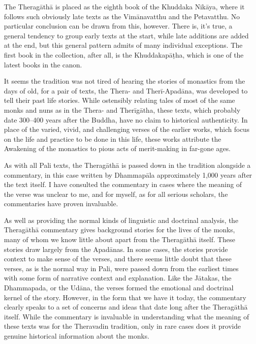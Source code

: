 \documentclass[12pt,openany]{book}%
\begin{document}
The \textsanskrit{Theragāthā} is placed as the eighth book of the Khuddaka \textsanskrit{Nikāya}, where it follows such obviously late texts as the \textsanskrit{Vimānavatthu} and the Petavatthu. No particular conclusion can be drawn from this, however. There is, it’s true, a general tendency to group early texts at the start, while late additions are added at the end, but this general pattern admits of many individual exceptions. The first book in the collection, after all, is the \textsanskrit{Khuddakapāṭha}, which is one of the latest books in the canon.

It seems the tradition was not tired of hearing the stories of monastics from the days of old, for a pair of texts, the Thera- and \textsanskrit{Therī}-\textsanskrit{Apadāna}, was developed to tell their past life stories. While ostensibly relating tales of most of the same monks and nuns as in the Thera- and \textsanskrit{Therīgātha}, these texts, which probably date 300–400 years after the Buddha, have no claim to historical authenticity. In place of the varied, vivid, and challenging verses of the earlier works, which focus on the life and practice to be done in this life, these works attribute the Awakening of the monastics to pious acts of merit-making in far-gone ages.

As with all Pali texts, the \textsanskrit{Theragāthā} is passed down in the tradition alongside a commentary, in this case written by \textsanskrit{Dhammapāla} approximately 1,000 years after the text itself. I have consulted the commentary in cases where the meaning of the verse was unclear to me, and for myself, as for all serious scholars, the commentaries have proven invaluable.

As well as providing the normal kinds of linguistic and doctrinal analysis, the \textsanskrit{Theragāthā} commentary gives background stories for the lives of the monks, many of whom we know little about apart from the \textsanskrit{Theragāthā} itself. These stories draw largely from the \textsanskrit{Apadānas}. In some cases, the stories provide context to make sense of the verses, and there seems little doubt that these verses, as is the normal way in Pali, were passed down from the earliest times with some form of narrative context and explanation. Like the \textsanskrit{Jātakas}, the Dhammapada, or the \textsanskrit{Udāna}, the verses formed the emotional and doctrinal kernel of the story. However, in the form that we have it today, the commentary clearly speaks to a set of concerns and ideas that date long after the \textsanskrit{Theragāthā} itself. While the commentary is invaluable in understanding what the meaning of these texts was for the Theravadin tradition, only in rare cases does it provide genuine historical information about the monks.
\end{document}
